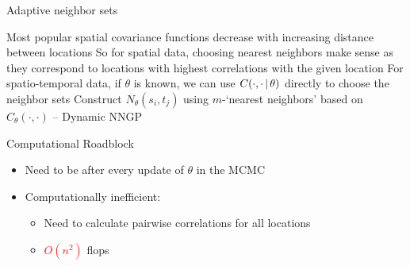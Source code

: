 \begin{frame}{Adaptive neighbor sets}
	
	
	\begin{itemize}
		\myitem Most popular spatial covariance functions decrease with increasing distance between locations
		\myitem So for spatial data, choosing nearest neighbors make sense as they correspond to locations with highest correlations with the given location
		\pause
		\myitem For spatio-temporal data, if $\theta$ is known, we can use $C(\cdot , \cdot \,|\, \theta )$ directly to choose the neighbor sets
		\myitem Construct  $N_\theta(s_i,t_j)$ using $m$-`nearest neighbors' based on $C_{\theta}(\cdot , \cdot)$ -- %
		\alert{Dynamic NNGP}
	\end{itemize}
	
\end{frame}
\begin{frame}{Computational Roadblock}
\begin{itemize}
\myitem Neighbor sets now 
\begin{figure}[t]
\begin{center}
\hskip -5mm 
\end{center}
\caption{Adaptive neighbor sets (green) of the red point for different choices of $\theta$}
\end{figure}
\item Need to be  after every update of $\theta$ in the MCMC
\item Computationally inefficient: 
\begin{itemize}
\item Need to calculate pairwise correlations for all locations
\item \textcolor{red}{$O(n^2)$} flops
\end{itemize}
\end{itemize}
\end{frame}


